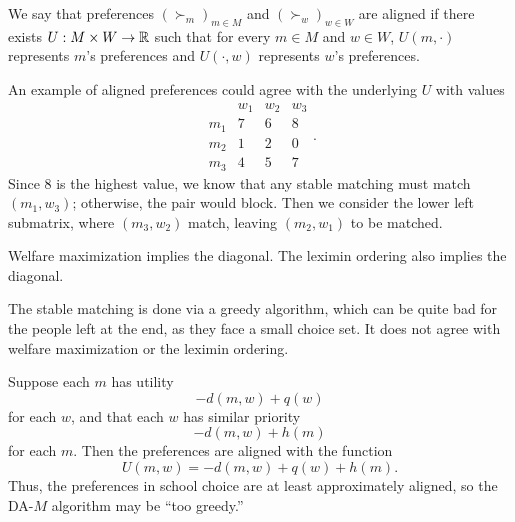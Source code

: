 \begin{definition}[Aligned]
	We say that preferences $\left( \succ_m \right)_{m \in M}$ and $\left( \succ_w \right)_{w \in W}$ are aligned if there exists $U : M \times W \to \mathbb{R}$ such that for every $m \in M$ and $w \in W$, $U(m,\cdot)$ represents $m$'s preferences and $U(\cdot, w)$ represents $w$'s preferences.
\end{definition}

An example of aligned preferences could agree with the underlying $U$ with values \[
	\begin{array}{c|cccc}
		 & w_1 & w_2 & w_3 \\
		 \hline
		m_1 & 7 & 6 & 8\\
		m_2 & 1 & 2 & 0 \\
		m_3 & 4 & 5 & 7
	\end{array}
.\] 
Since $8$ is the highest value, we know that any stable matching must match $(m_1,w_3)$; otherwise, the pair would block. Then we consider the lower left submatrix, where $(m_3,w_2)$ match, leaving $(m_2,w_1)$ to be matched.

Welfare maximization implies the diagonal. The leximin ordering also implies the diagonal.

The stable matching is done via a greedy algorithm, which can be quite bad for the people left at the end, as they face a small choice set. It does not agree with welfare maximization or the leximin ordering.

Suppose each $m$ has utility \[
	-d(m,w) + q(w)
\] for each $w$, and that each $w$ has similar priority \[
	-d(m,w)  + h(m)
\] 
for each $m$.
Then the preferences are aligned with the function \[
	U(m,w) = -d(m,w) + q(w) + h(m)
.\] 
Thus, the preferences in school choice are at least approximately aligned, so the DA-$M$ algorithm may be ``too greedy.''


